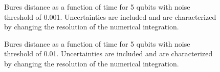 \pagebreak

\begin{figure}
\begin{center}
\end{center}
\caption{Bures distance as a function of time for 5 qubits with noise
threshold of 0.001.  Uncertainties are included and are characterized 
by changing the resolution of the numerical integration.}
\end{figure}

\pagebreak

\begin{figure}
\begin{center}
\end{center}
\caption{Bures distance as a function of time for 5 qubits with noise
threshold of 0.01.  Uncertainties are included and are characterized 
by changing the resolution of the numerical integration.}
\end{figure}

